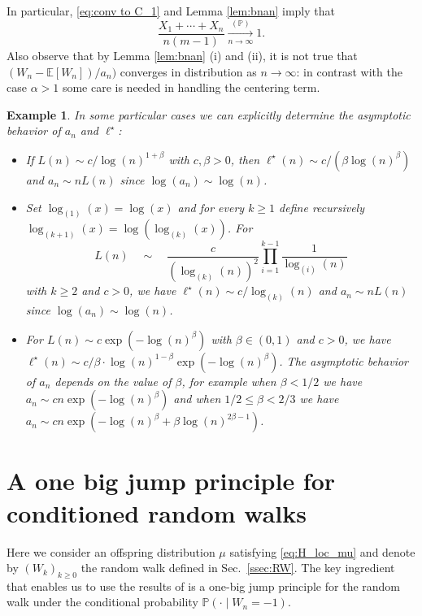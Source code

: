 \documentclass[a4paper,11pt]{article}
\DeclareRobustCommand{\P}{\mathbb{P}}
\DeclareRobustCommand{\E}{\mathbb{E}}
\DeclareRobustCommand{\prob}{\xrightarrow[n \rightarrow \infty]{(\P)}}
\newtheorem{example}[theorem]{Example}
\begin{document}
In particular, \eqref{eq:conv to C_1} and Lemma  \ref{lem:bnan} imply that
   \begin{equation}\label{eq:proba}
            \frac{X_1+ \cdots +X_n}{n (m-1)} \prob 1.
        \end{equation}
        Also observe that by Lemma \ref{lem:bnan} (i) and (ii), it is not true that $(W_{n}- \E[W_{n}])/a_{n})$ converges in distribution as $n \rightarrow \infty$: in contrast with the case $\alpha>1$ some care is needed in handling the centering term.




\begin{example}
\label{ex:anl}
In some particular cases we can explicitly determine the asymptotic behavior of $a_n$ and $\ell^\star$: 
\begin{itemize}
\item[(i)] If $L(n)\sim c  / \log(n)^{1+\beta}$ with $c,\beta>0$, then $\ell^\star(n) \sim c/(\beta \log(n)^{\beta})$ and $a_n \sim   n L(n)$ since $\log(a_n) \sim \log(n)$.
\item[(ii)] Set $\log_{(1)}(x)=\log(x)$ and for every $k \geq 1$ define recursively $\log_{(k+1)} (x) = \log(\log_{(k)}(x))$. For
 \[
 L(n) \quad \sim \quad  \frac{c}{(\log_{(k)}(n))^{2}} \prod_{i=1}^{k-1} \frac{1}{\log_{(i)}(n) } \]
 with $k \geq 2$ and $c>0$, we have $\ell^\star(n) \sim c/\log_{(k)}(n)$ and $a_n \sim   n L(n)$  since $\log(a_n) \sim \log(n)$. 
\item[(iii)]   For $L(n) \sim  c   \exp(-\log(n)^{\beta}) $ with $\beta \in (0,1)$ and $c>0$, we have $\ell^\star(n) \sim   c/\beta \cdot \log(n)^{1-\beta} \exp(-\log(n)^{\beta})$. The asymptotic behavior of $a_n$ depends on the value of $\beta$, for example when $\beta<1/2$ we have $a_n \sim c   n\exp(-\log(n)^{\beta}) $ and when $1/2 \leq \beta <2/3$ we have $a_n \sim c   n \exp(-\log(n)^{\beta} + \beta \log(n)^{2 \beta-1})$.
\end{itemize}
\end{example}

\section{A one big jump principle for conditioned random walks}
\label{sec:jump}

Here we consider an offspring distribution $\mu$ satisfying \eqref{eq:H_loc_mu} and denote by  $(W_{k})_{k \geq 0}$   the random walk defined in Sec.~\ref{ssec:RW}. The key ingredient that enables us to use the results of \cite{Kortchemski_2013} is a one-big jump principle for the random walk under the conditional probability $\P(\cdot\mid W_n=-1)$. 
\end{document}
